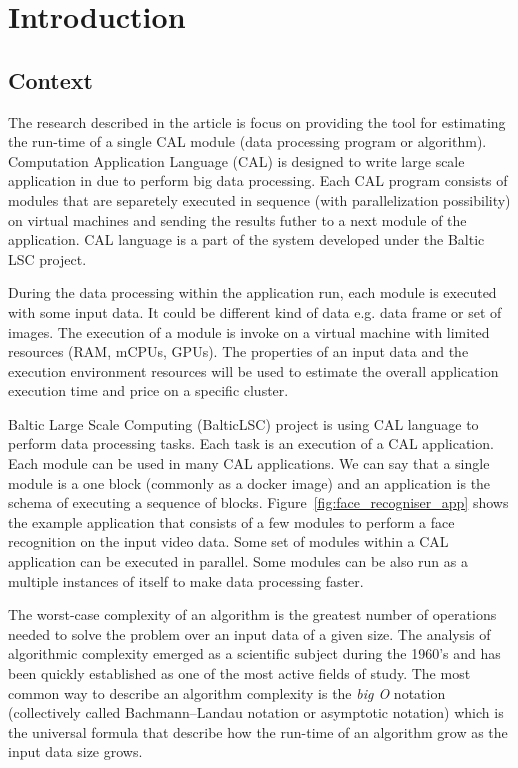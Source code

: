 \section{Introduction}
\subsection{Context}

The research described in the article is focus on providing the tool for estimating the run-time of a single CAL module (data processing program or algorithm). Computation Application Language (CAL) is designed to write large scale application in due to perform big data processing. Each CAL program consists of modules that are separetely executed in sequence (with parallelization possibility) on virtual machines and sending the results futher to a next module of the application. CAL language is a part of the system developed under the Baltic LSC\cite{baltic_lsc_website} project.

During the data processing within the application run, each module is executed with some input data. It could be different kind of data e.g. data frame or set of images. The execution of a module is invoke on a virtual machine with limited resources (RAM, mCPUs, GPUs). The properties of an input data and the execution environment resources will be used to estimate the overall application execution time and price on a specific cluster.

Baltic Large Scale Computing (BalticLSC\cite{baltic_lsc}) project is using CAL language to perform data processing tasks. Each task is an execution of a CAL application. Each module can be used in many CAL applications. We can say that a single module is a one block (commonly as a docker image) and an application is the schema of executing a sequence of blocks. Figure~\ref{fig:face_recogniser_app} shows the example application that consists of a few modules to perform a face recognition on the input video data. Some set of modules within a CAL application can be executed in parallel. Some modules can be also run as a multiple instances of itself to make data processing faster.

The worst-case complexity of an algorithm is the greatest number of operations needed to solve the problem over an input data of a given size. The analysis of algorithmic complexity emerged as a scientific subject during the 1960’s and has been quickly established as one of the most active fields of study\cite{complexity}. The most common way to describe an algorithm complexity is the \textit{big O} notation (collectively called Bachmann–Landau notation or asymptotic notation) which is the universal formula that describe how the run-time of an algorithm grow as the input data size grows. 

